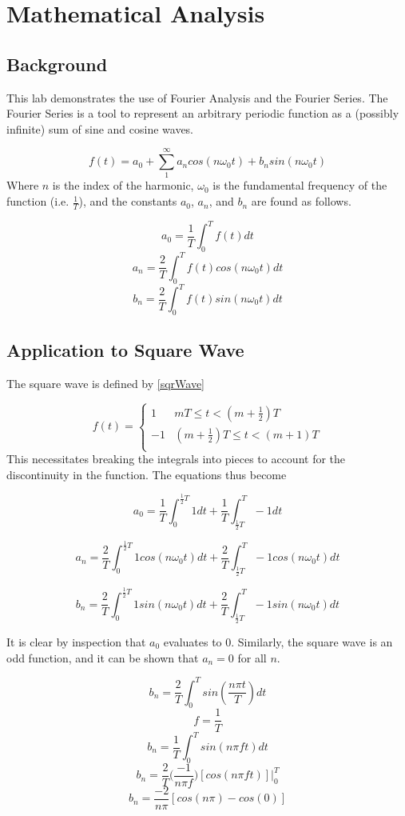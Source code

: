 \documentclass[main.tex]{subfile}
\begin{document}
	\section{Mathematical Analysis}
	\subsection{Background}
	This lab demonstrates the use of Fourier Analysis and the Fourier Series. The
	Fourier Series is a tool to represent an arbitrary periodic function as a
	(possibly infinite) sum of sine and cosine waves.
	
	$$f(t) = a_0 + \sum_{1}^{\infty} a_n cos(n \omega_0 t) + b_n sin(n \omega_0 t)$$ 
	Where $n$ is the index of the harmonic, $\omega_0$ is the fundamental
	frequency of the function (i.e. $\frac{1}{T}$), and the constants $a_0$,
	$a_n$, and $b_n$ are found as follows.
	
	$$a_0 = \frac{1}{T} \int_{0}^{T}f(t)dt$$
	$$a_n = \frac{2}{T} \int_{0}^{T}f(t) cos(n \omega_0 t)dt$$
	$$b_n = \frac{2}{T} \int_{0}^{T}f(t) sin(n \omega_0 t)dt$$

	\subsection{Application to Square Wave}
	The square wave is defined by \eqref{sqrWave}

	\[ f(t) =  \begin{cases}
	1 & mT \leq t < (m + \frac{1}{2})T \\
	-1 & (m + \frac{1}{2})T \leq t < (m + 1)T \\
	\end{cases} \label{eq:sqrWave}
	\]
	This necessitates breaking the integrals into pieces to account for the
	discontinuity in the function. The equations thus become
	
	$$a_0 = \frac{1}{T} \int_{0}^{\frac{1}{2}T}1dt + \frac{1}{T} \int_{\frac{1}{2}T}^{T} -1dt$$ 
	
	$$a_n = \frac{2}{T} \int_{0}^{\frac{1}{2}T}1cos(n \omega_0 t)dt + \frac{2}{T} \int_{\frac{1}{2}T}^{T}-1cos(n \omega_0 t)dt $$
	
	$$b_n = \frac{2}{T} \int_{0}^{\frac{1}{2}T}1sin(n \omega_0 t)dt + \frac{2}{T} \int_{\frac{1}{2}T}^{T} -1sin(n \omega_0 t)dt $$
	
	It is clear by inspection that $a_0$ evaluates to 0. Similarly, the square
	wave is an odd function, and it can be shown that $a_n = 0$ for all $n$.
	
	$$b_n = \frac{2}{T} \int_{0}^{T} sin(\frac{n \pi t}{T}) dt$$
	$$f = \frac{1}{T}$$
	$$b_n = \frac{1}{T} \int_{0}^{T} sin(n \pi f t) dt$$
	$$b_n = \frac{2}{T} \Big(\frac{-1}{n \pi f}\Big) [cos(n \pi f t)] \Big|_0^T$$
	$$b_n = \frac{-2}{n \pi} [cos(n \pi) - cos(0)]$$
	
\end{document}
